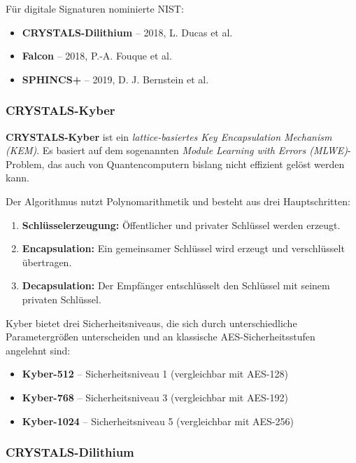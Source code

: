 \noindent Für digitale Signaturen nominierte NIST:

\begin{itemize}
  \item \textbf{CRYSTALS-Dilithium} – 2018, L. Ducas et al.

  \item \textbf{Falcon} – 2018, P.-A. Fouque et al.

  \item \textbf{SPHINCS+} – 2019, D. J. Bernstein et al.
\end{itemize}

\subsubsection*{CRYSTALS-Kyber}

\textbf{CRYSTALS-Kyber} ist ein \textit{lattice-basiertes Key Encapsulation Mechanism (KEM)}. Es basiert auf dem sogenannten \textit{Module Learning with Errors (MLWE)}-Problem, das auch von Quantencomputern bislang nicht effizient gelöst werden kann.

Der Algorithmus nutzt Polynomarithmetik und besteht aus drei Hauptschritten:

\begin{enumerate}
  \item \textbf{Schlüsselerzeugung:} Öffentlicher und privater Schlüssel werden erzeugt.
  \item \textbf{Encapsulation:} Ein gemeinsamer Schlüssel wird erzeugt und verschlüsselt übertragen.
  \item \textbf{Decapsulation:} Der Empfänger entschlüsselt den Schlüssel mit seinem privaten Schlüssel.
\end{enumerate}

\noindent Kyber bietet drei Sicherheitsniveaus, die sich durch unterschiedliche Parametergrößen unterscheiden und an klassische AES-Sicherheitsstufen angelehnt sind:

\begin{itemize}
  \item \textbf{Kyber-512} – Sicherheitsniveau 1 (vergleichbar mit AES-128)
  \item \textbf{Kyber-768} – Sicherheitsniveau 3 (vergleichbar mit AES-192)
  \item \textbf{Kyber-1024} – Sicherheitsniveau 5 (vergleichbar mit AES-256)
\end{itemize}

\subsubsection*{CRYSTALS-Dilithium}

